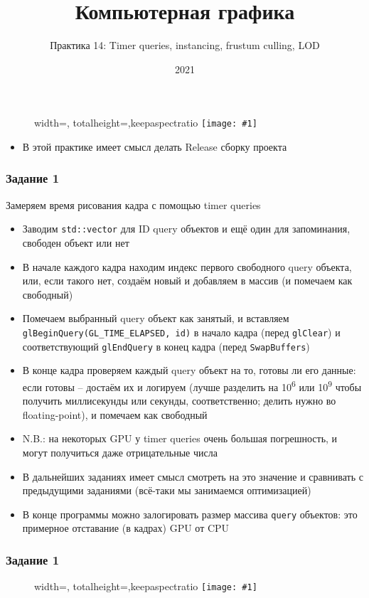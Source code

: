 \documentclass{beamer}
\title{Компьютерная графика}
\subtitle{Практика 14: Timer queries, instancing, frustum culling, LOD}
\date{2021}
\newcommand{\slideimage}[1]{
  \begin{figure}
    \begin{adjustbox}{width=\textwidth, totalheight=\textheight-2\baselineskip-2\baselineskip,keepaspectratio}
      \texttt{[image: \#1]}
    \end{adjustbox}
  \end{figure}
}
\begin{document}
\frame{\titlepage}

\begin{frame}
\slideimage{0.png}
\end{frame}

\begin{frame}[fragile]
\begin{itemize}
\item В этой практике имеет смысл делать Release сборку проекта
\end{itemize}
\end{frame}

\begin{frame}[fragile]
\fontsize{10pt}{10pt}
\frametitle{Задание 1}
Замеряем время рисования кадра с помощью timer queries
\begin{itemize}
\item Заводим \verb|std::vector| для ID query объектов и ещё один для запоминания, свободен объект или нет
\item В начале каждого кадра находим индекс первого свободного query объекта, или, если такого нет, создаём новый и добавляем в массив (и помечаем как свободный)
\item Помечаем выбранный query объект как занятый, и вставляем \verb|glBeginQuery(GL_TIME_ELAPSED, id)| в начало кадра (перед \verb|glClear|) и соответствующий \verb|glEndQuery| в конец кадра (перед \verb|SwapBuffers|)
\item В конце кадра проверяем каждый query объект на то, готовы ли его данные: если готовы -- достаём их и логируем (лучше разделить на 10\textsuperscript{6} или 10\textsuperscript{9} чтобы получить миллисекунды или секунды, соответственно; делить нужно во floating-point), и помечаем как свободный
\item N.B.: на некоторых GPU у timer queries очень большая погрешность, и могут получиться даже отрицательные числа
\item В дальнейших заданиях имеет смысл смотреть на это значение и сравнивать с предыдущими заданиями (всё-таки мы занимаемся оптимизацией)
\item В конце программы можно залогировать размер массива \verb|query| объектов: это примерное отставание (в кадрах) GPU от CPU
\end{itemize}
\end{frame}

\begin{frame}
\frametitle{Задание 1}
\slideimage{0.png}
\end{frame}
\end{document}
